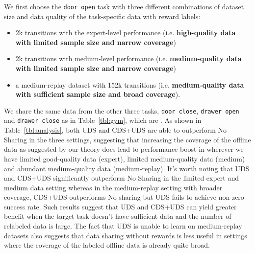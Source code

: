 {We first choose the \texttt{door open} task with three different combinations of dataset size and data quality of the task-specific data with reward labels:
\begin{itemize}
    \item 2k transitions with the expert-level performance (i.e. \textbf{high-quality data with limited sample size and narrow coverage})
    \item 2k transitions with medium-level performance (i.e. \textbf{medium-quality data with limited sample size and narrow coverage})
    \item a medium-replay dataset with 152k transitions (i.e. \textbf{medium-quality data with sufficient sample size and broad coverage}).
\end{itemize}
 We share the same data from the other three tasks, \texttt{door close}, \texttt{drawer open} and \texttt{drawer close} as in Table~\ref{tbl:gym}, which are . As shown in Table~\ref{tbl:analysis}, both UDS and CDS+UDS are able to outperform No Sharing in the three settings, suggesting that increasing the coverage of the offline data as suggested by our theory does lead to performance boost in wherever we have limited good-quality data (expert), limited medium-quality data (medium) and abundant medium-quality data (medium-replay). It’s worth noting that UDS and CDS+UDS significantly outperform No Sharing in the limited expert and medium data setting whereas in the medium-replay setting with broader coverage, CDS+UDS outperforms No sharing but UDS fails to achieve non-zero success rate. Such results suggest that UDS and CDS+UDS can yield greater benefit when the target task doesn’t have sufficient data and the number of relabeled data is large. The fact that UDS is unable to learn on medium-replay datasets also suggests that data sharing without rewards is less useful in settings where the coverage of the labeled offline data is already quite broad.}

\subsection{}
\label{app:unlabeled_dataset_size_analysis}

